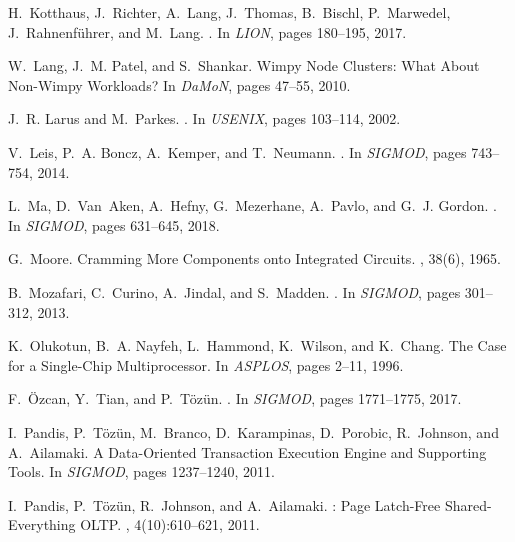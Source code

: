 \documentclass[11pt]{article}
\begin{document}
\begin{thebibliography}{10}
\begin{small}
H.~Kotthaus, J.~Richter, A.~Lang, J.~Thomas, B.~Bischl, P.~Marwedel,
  J.~Rahnenführer, and M.~Lang.
.
\newblock In {\em LION}, pages 180--195, 2017.

W.~Lang, J.~M. Patel, and S.~Shankar.
\newblock Wimpy {N}ode {C}lusters: {W}hat {A}bout {N}on-{W}impy {W}orkloads?
\newblock In {\em DaMoN}, pages 47--55, 2010.

J.~R. Larus and M.~Parkes.
.
\newblock In {\em USENIX}, pages 103--114, 2002.

V.~Leis, P.~A. Boncz, A.~Kemper, and T.~Neumann.
.
\newblock In {\em SIGMOD}, pages 743--754, 2014.

L.~Ma, D.~Van~Aken, A.~Hefny, G.~Mezerhane, A.~Pavlo, and G.~J. Gordon.
.
\newblock In {\em SIGMOD}, pages 631--645, 2018.

G.~Moore.
\newblock Cramming {M}ore {C}omponents onto {I}ntegrated {C}ircuits.
, 38(6), 1965.

B.~Mozafari, C.~Curino, A.~Jindal, and S.~Madden.
.
\newblock In {\em SIGMOD}, pages 301--312, 2013.

K.~Olukotun, B.~A. Nayfeh, L.~Hammond, K.~Wilson, and K.~Chang.
\newblock The {C}ase for a {S}ingle-{C}hip {M}ultiprocessor.
\newblock In {\em ASPLOS}, pages 2--11, 1996.

F.~{\"{O}}zcan, Y.~Tian, and P.~T{\"{o}}z{\"{u}}n.
.
\newblock In {\em SIGMOD}, pages 1771--1775, 2017.

I.~Pandis, P.~T\"oz\"un, M.~Branco, D.~Karampinas, D.~Porobic, R.~Johnson, and
  A.~Ailamaki.
\newblock A {D}ata-{O}riented {T}ransaction {E}xecution {E}ngine and
  {S}upporting {T}ools.
\newblock In {\em SIGMOD}, pages 1237--1240, 2011.

I.~Pandis, P.~T\"oz\"un, R.~Johnson, and A.~Ailamaki.
: {P}age {L}atch-{F}ree {S}hared-{E}verything {OLTP}.
, 4(10):610--621, 2011.


\end{small}
\end{thebibliography}
\end{document}
